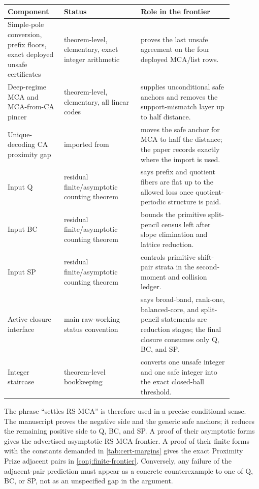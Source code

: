 \documentclass[11pt]{article}
\theoremstyle{definition}
\theoremstyle{remark}
\begin{document}
\begin{center}\small
\begin{tabular}{@{}p{0.22\linewidth}p{0.30\linewidth}p{0.36\linewidth}@{}}
\toprule
Component & Status & Role in the frontier \\
\midrule
Simple-pole conversion, prefix floors, exact deployed unsafe certificates & theorem-level, elementary, exact integer arithmetic & proves the last unsafe agreement on the four deployed MCA/list rows. \\
Deep-regime MCA and MCA-from-CA pincer & theorem-level, elementary, all linear codes & supplies unconditional safe anchors and removes the support-mismatch layer up to half distance. \\
Unique-decoding CA proximity gap & imported from \cite{BCIKS20} & moves the safe anchor for MCA to half the distance; the paper records exactly where the import is used. \\
Input Q & residual finite/asymptotic counting theorem & says prefix and quotient fibers are flat up to the allowed loss once quotient-periodic structure is paid. \\
Input BC & residual finite/asymptotic counting theorem & bounds the primitive split-pencil census left after slope elimination and lattice reduction. \\
Input SP & residual finite/asymptotic counting theorem & controls primitive shift-pair strata in the second-moment and collision ledger. \\
Active closure interface & main raw-working status convention & says broad-band, rank-one, balanced-core, and split-pencil statements are reduction stages; the final closure consumes only Q, BC, and SP. \\
Integer staircase & theorem-level bookkeeping & converts one unsafe integer and one safe integer into the exact closed-ball threshold. \\
\bottomrule
\end{tabular}
\end{center}

The phrase ``settles RS MCA'' is therefore used in a precise conditional sense.  The manuscript proves the negative side and the generic safe anchors; it reduces the remaining positive side to Q, BC, and SP.  A proof of their asymptotic forms gives the advertised asymptotic RS MCA frontier.  A proof of their finite forms with the constants demanded in \cref{tab:cert-margins} gives the exact Proximity Prize adjacent pairs in \cref{conj:finite-frontier}.  Conversely, any failure of the adjacent-pair prediction must appear as a concrete counterexample to one of Q, BC, or SP, not as an unspecified gap in the argument.
\end{document}
